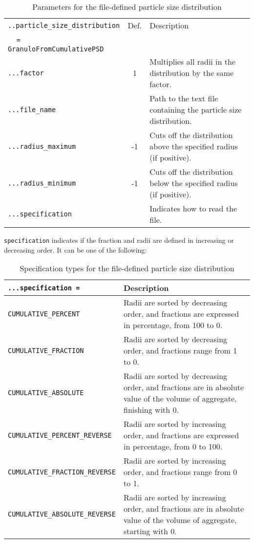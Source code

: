 \documentclass[10pt]{article}
\begin{document}
\begin{table}[h!]
\begin{tabularx}{\textwidth}{lcX}
\verb+..particle_size_distribution+ & Def. & Description\\
\textcolor{white}{....}\verb+= GranuloFromCumulativePSD+ & & \\
\hline
\verb+...factor+ & 1 & Multiplies all radii in the distribution by the same factor. \\
\verb+...file_name+ & & Path to the text file containing the particle size distribution. \\
\verb+...radius_maximum+ & -1 & Cuts off the distribution above the specified radius (if positive). \\
\verb+...radius_minimum+ & -1 & Cuts off the distribution below the specified radius (if positive). \\
\verb+...specification+ & & Indicates how to read the file. \\
\hline
\end{tabularx}
\caption{Parameters for the file-defined particle size distribution}
\end{table}

\verb+specification+ indicates if the fraction and radii are defined in increasing or decreasing order.
It can be one of the following:

\begin{table}[h!]
\begin{tabularx}{\textwidth}{lX}
\verb+...specification =+ & Description \\
\hline
\verb+CUMULATIVE_PERCENT+ & Radii are sorted by decreasing order, and fractions are expressed in percentage, from 100 to 0. \\
\verb+CUMULATIVE_FRACTION+ & Radii are sorted by decreasing order, and fractions range from 1 to 0. \\
\verb+CUMULATIVE_ABSOLUTE+ & Radii are sorted by decreasing order, and fractions are in absolute value of the volume of aggregate, finishing with 0. \\
\verb+CUMULATIVE_PERCENT_REVERSE+ & Radii are sorted by increasing order, and fractions are expressed in percentage, from 0 to 100. \\
\verb+CUMULATIVE_FRACTION_REVERSE+ & Radii are sorted by increasing order, and fractions range from 0 to 1. \\
\verb+CUMULATIVE_ABSOLUTE_REVERSE+ & Radii are sorted by increasing order, and fractions are in absolute value of the volume of aggregate, starting with 0. \\
\hline
\end{tabularx}
\caption{Specification types for the file-defined particle size distribution}
\end{table}
\end{document}

